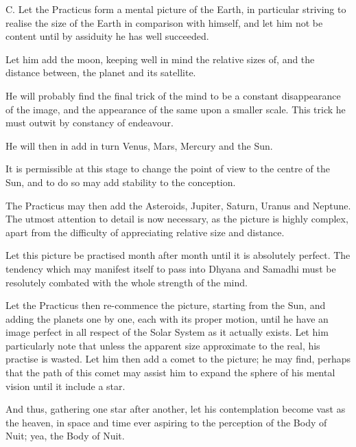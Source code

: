 \begin{quoting}

C. Let the Practicus form a mental picture of the Earth, in particular striving to realise the size of the Earth in comparison with himself, and let him not be content until by assiduity he has well succeeded.

Let him add the moon, keeping well in mind the relative sizes of, and the distance between, the planet and its satellite.

He will probably find the final trick of the mind to be a constant disappearance of the image, and the appearance of the same upon a smaller scale. This trick he must outwit by constancy of endeavour.

He will then in add in turn Venus, Mars, Mercury and the Sun.

It is permissible at this stage to change the point of view to the centre of the Sun, and to do so may add stability to the conception.

The Practicus may then add the Asteroids, Jupiter, Saturn, Uranus and Neptune. The utmost attention to detail is now necessary, as the picture is highly complex, apart from the difficulty of appreciating relative size and distance.

Let this picture be practised month after month until it is absolutely perfect. The tendency which may manifest itself to pass into Dhyana and Samadhi must be resolutely combated with the whole strength of the mind.

Let the Practicus then re-commence the picture, starting from the Sun, and adding the planets one by one, each with its proper motion, until he have an image perfect in all respect of the Solar System as it actually exists. Let him particularly note that unless the apparent size approximate to the real, his practise is wasted. Let him then add a comet to the picture; he may find, perhaps that the path of this comet may assist him to expand the sphere of his mental vision until it include a star.

And thus, gathering one star after another, let his contemplation become vast as the heaven, in space and time ever aspiring to the perception of the Body of Nuit; yea, the Body of Nuit.
\end{quoting}

